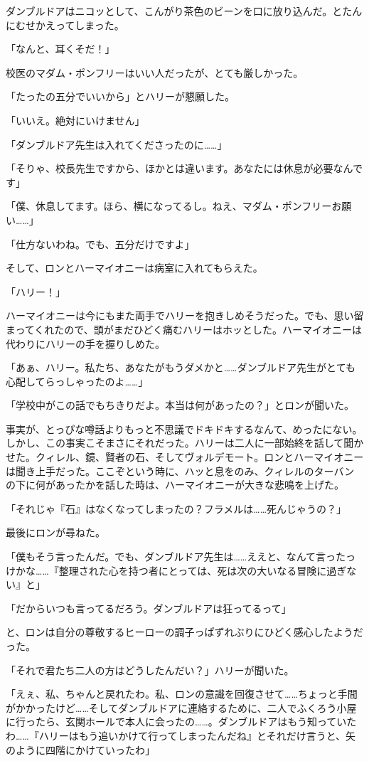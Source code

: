 \documentclass[10pt,a4paper]{article}
\begin{document}
\begin{CJK}{UTF8}{min}
ダンブルドアはニコッとして、こんがり茶色のビーンを口に放り込んだ。とたんにむせかえってしまった。

「なんと、耳くそだ！」

校医のマダム・ポンフリーはいい人だったが、とても厳しかった。

「たったの五分でいいから」とハリーが懇願した。

「いいえ。絶対にいけません」

「ダンブルドア先生は入れてくださったのに……」

「そりゃ、校長先生ですから、ほかとは違います。あなたには休息が必要なんです」

「僕、休息してます。ほら、横になってるし。ねえ、マダム・ポンフリーお願い……」

「仕方ないわね。でも、五分だけですよ」

そして、ロンとハーマイオニーは病室に入れてもらえた。

「ハリー！」

ハーマイオニーは今にもまた両手でハリーを抱きしめそうだった。でも、思い留まってくれたので、頭がまだひどく痛むハリーはホッとした。ハーマイオニーは代わりにハリーの手を握りしめた。

「あぁ、ハリー。私たち、あなたがもうダメかと……ダンブルドア先生がとても心配してらっしゃったのよ……」

「学校中がこの話でもちきりだよ。本当は何があったの？」とロンが聞いた。

事実が、とっぴな噂話よりもっと不思議でドキドキするなんて、めったにない。しかし、この事実こそまさにそれだった。ハリーは二人に一部始終を話して聞かせた。クィレル、鏡、賢者の石、そしてヴォルデモート。ロンとハーマイオニーは聞き上手だった。ここぞという時に、ハッと息をのみ、クィレルのターバンの下に何があったかを話した時は、ハーマイオニーが大きな悲鳴を上げた。

「それじゃ『石』はなくなってしまったの？フラメルは……死んじゃうの？」

最後にロンが尋ねた。

「僕もそう言ったんだ。でも、ダンブルドア先生は……ええと、なんて言ったっけかな……『整理された心を持つ者にとっては、死は次の大いなる冒険に過ぎない』と」

「だからいつも言ってるだろう。ダンブルドアは狂ってるって」

と、ロンは自分の尊敬するヒーローの調子っぱずれぶりにひどく感心したようだった。

「それで君たち二人の方はどうしたんだい？」ハリーが聞いた。

「えぇ、私、ちゃんと戻れたわ。私、ロンの意識を回復させて……ちょっと手間がかかったけど……そしてダンブルドアに連絡するために、二人でふくろう小屋に行ったら、玄関ホールで本人に会ったの……。ダンブルドアはもう知っていたわ……『ハリーはもう追いかけて行ってしまったんだね』とそれだけ言うと、矢のように四階にかけていったわ」


\end{CJK}
\end{document}
